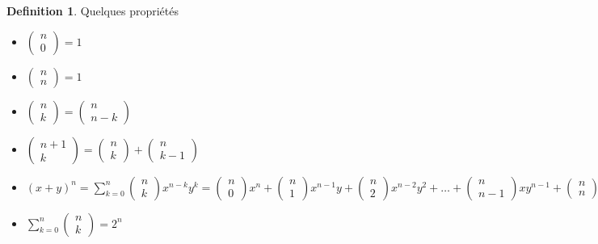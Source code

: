 \documentclass[]{book}
\theoremstyle{definition}
\newtheorem{defn}{Definition}
\begin{document}
\begin{defn}
Quelques propri\'et\'es
\begin{itemize}
\item $\begin{pmatrix}n\\0\end{pmatrix} = 1$
\item $\begin{pmatrix}n\\n\end{pmatrix} = 1$
\item $\begin{pmatrix}n\\k\end{pmatrix} = \begin{pmatrix}n\\n-k\end{pmatrix}$ 
\item $\begin{pmatrix}n+1\\k\end{pmatrix} = \begin{pmatrix}n\\k\end{pmatrix} +\begin{pmatrix}n\\k-1\end{pmatrix}$ 
\item $(x+y)^n = \sum_{k=0}^{n}\begin{pmatrix}n\\k\end{pmatrix}x^{n-k}y^{k} = \begin{pmatrix}n\\0\end{pmatrix}x^n + \begin{pmatrix}n\\1\end{pmatrix}x^{n-1}y+ \begin{pmatrix}n\\2\end{pmatrix}x^{n-2}y^2+ \ldots +\begin{pmatrix}n\\n-1\end{pmatrix}xy^{n-1} + \begin{pmatrix}n\\n\end{pmatrix}y^n$
\item $\sum_{k=0}^{n}\begin{pmatrix}n\\k\end{pmatrix} = 2^{n}$
\end{itemize}  
\end{defn}
\end{document}
